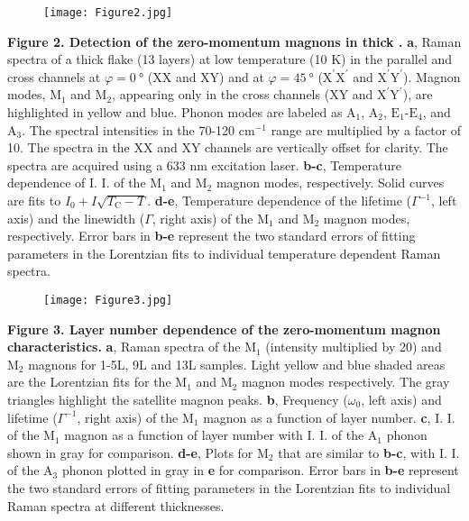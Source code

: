 \documentclass[prl, preprint, superscriptaddress]{revtex4-1}
\begin{document}
\newpage
\begin{figure}
\texttt{[image: Figure2.jpg]}
\end{figure}
\vspace{-10pt}
\begin{footnotesize}
\noindent \textbf{Figure 2. Detection of the zero-momentum magnons in thick .} \textbf{a}, Raman spectra of a thick  flake (13 layers) at low temperature (10 K) in the parallel and cross channels at $\varphi=\SI{0}{\degree}$ (XX and XY) and at $\varphi=\SI{45}{\degree}$ ($\mathrm{X^{\prime}X^{\prime}}$ and $\mathrm{X^{\prime}Y^{\prime}}$). Magnon modes, $\mathrm{M_1}$ and $\mathrm{M_2}$, appearing only in the cross channels (XY and $\mathrm{X^{\prime}Y^{\prime}}$), are highlighted in yellow and blue. Phonon modes are labeled as $\mathrm{A_1}$, $\mathrm{A_2}$, $\mathrm{E_1}$-$\mathrm{E_4}$, and $\mathrm{A_3}$. The spectral intensities in the 70-120 $\mathrm{cm}^{-1}$ range are multiplied by a factor of 10. The spectra in the XX and XY channels are vertically offset for clarity. The spectra are acquired using a 633 nm excitation laser. \textbf{b-c}, Temperature dependence of I. I. of the $\mathrm{M_1}$ and $\mathrm{M_2}$ magnon modes, respectively. Solid curves are fits to $I_0+I\sqrt{T_\mathrm{C}-T}$. \textbf{d-e}, Temperature dependence of the lifetime ($\varGamma^{-1}$, left axis) and the linewidth ($\varGamma$, right axis) of the $\mathrm{M_1}$ and $\mathrm{M_2}$ magnon modes, respectively. Error bars in \textbf{b-e} represent the two standard errors of fitting parameters in the Lorentzian fits to individual temperature dependent Raman spectra.
\end{footnotesize}

\newpage
\begin{figure}
\texttt{[image: Figure3.jpg]}
\end{figure}
\begin{footnotesize}
\noindent\textbf{Figure 3. Layer number dependence of the zero-momentum magnon characteristics.} \textbf{a}, Raman spectra of the $\mathrm{M_1}$ (intensity multiplied by 20) and $\mathrm{M_2}$ magnons for 1-5L, 9L and 13L samples. Light yellow and blue shaded areas are the Lorentzian fits for the $\mathrm{M_1}$ and $\mathrm{M_2}$ magnon modes respectively. The gray triangles highlight the satellite magnon peaks.  \textbf{b}, Frequency ($\omega_0$, left axis) and lifetime ($\varGamma^{-1}$, right axis) of the $\mathrm{M_1}$ magnon as a function of layer number. \textbf{c}, I. I. of the $\mathrm{M_1}$ magnon as a function of layer number with I. I. of the $\mathrm{A_1}$ phonon shown in gray for comparison. \textbf{d-e}, Plots for $\mathrm{M_2}$ that are similar to \textbf{b-c}, with I. I. of the $\mathrm{A_3}$ phonon plotted in gray in \textbf{e} for comparison. Error bars in \textbf{b-e} represent the two standard errors of fitting parameters in the Lorentzian fits to individual Raman spectra at different thicknesses.
\end{footnotesize}
\end{document}
